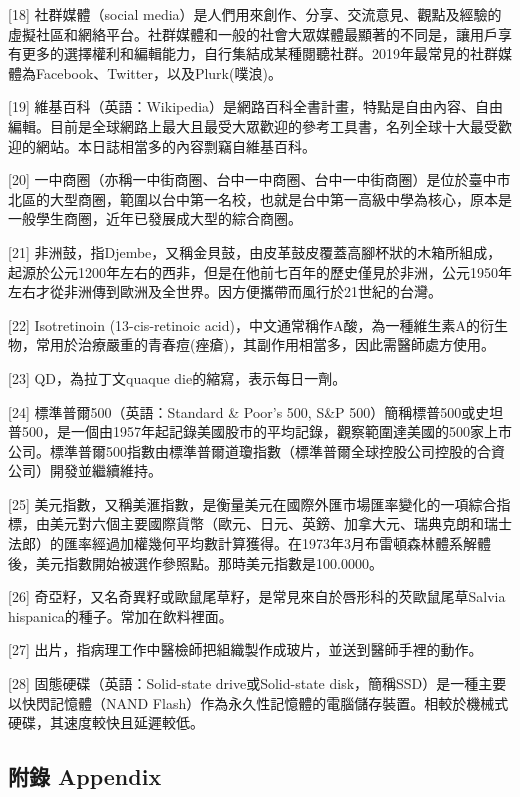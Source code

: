 \documentclass[
]{article}
\begin{document}
{[}18{]} 社群媒體（social
media）是人們用來創作、分享、交流意見、觀點及經驗的虛擬社區和網絡平台。社群媒體和一般的社會大眾媒體最顯著的不同是，讓用戶享有更多的選擇權利和編輯能力，自行集結成某種閱聽社群。2019年最常見的社群媒體為Facebook、Twitter，以及Plurk(噗浪)。

{[}19{]}
維基百科（英語：Wikipedia）是網路百科全書計畫，特點是自由內容、自由編輯。目前是全球網路上最大且最受大眾歡迎的參考工具書，名列全球十大最受歡迎的網站。本日誌相當多的內容剽竊自維基百科。

{[}20{]}
一中商圈（亦稱一中街商圈、台中一中商圈、台中一中街商圈）是位於臺中市北區的大型商圈，範圍以台中第一名校，也就是台中第一高級中學為核心，原本是一般學生商圈，近年已發展成大型的綜合商圈。

{[}21{]}
非洲鼓，指Djembe，又稱金貝鼓，由皮革鼓皮覆蓋高腳杯狀的木箱所組成，起源於公元1200年左右的西非，但是在他前七百年的歷史僅見於非洲，公元1950年左右才從非洲傳到歐洲及全世界。因方便攜帶而風行於21世紀的台灣。

{[}22{]} Isotretinoin (13-cis-retinoic
acid)，中文通常稱作A酸，為一種維生素A的衍生物，常用於治療嚴重的青春痘(痤瘡)，其副作用相當多，因此需醫師處方使用。

{[}23{]} QD，為拉丁文quaque die的縮寫，表示每日一劑。

{[}24{]} 標準普爾500（英語：Standard \& Poor's 500, S\&P
500）簡稱標普500或史坦普500，是一個由1957年起記錄美國股市的平均記錄，觀察範圍達美國的500家上市公司。標準普爾500指數由標準普爾道瓊指數（標準普爾全球控股公司控股的合資公司）開發並繼續維持。

{[}25{]}
美元指數，又稱美滙指數，是衡量美元在國際外匯市場匯率變化的一項綜合指標，由美元對六個主要國際貨幣（歐元、日元、英鎊、加拿大元、瑞典克朗和瑞士法郎）的匯率經過加權幾何平均數計算獲得。在1973年3月布雷頓森林體系解體後，美元指數開始被選作參照點。那時美元指數是100.0000。

{[}26{]}
奇亞籽，又名奇異籽或歐鼠尾草籽，是常見來自於唇形科的芡歐鼠尾草Salvia
hispanica的種子。常加在飲料裡面。

{[}27{]}
出片，指病理工作中醫檢師把組織製作成玻片，並送到醫師手裡的動作。

{[}28{]} 固態硬碟（英語：Solid-state drive或Solid-state
disk，簡稱SSD）是一種主要以快閃記憶體（NAND
Flash）作為永久性記憶體的電腦儲存裝置。相較於機械式硬碟，其速度較快且延遲較低。

\hypertarget{ux9644ux9304-appendix}{%
\subsection{附錄 Appendix}\label{ux9644ux9304-appendix}}
\end{document}
